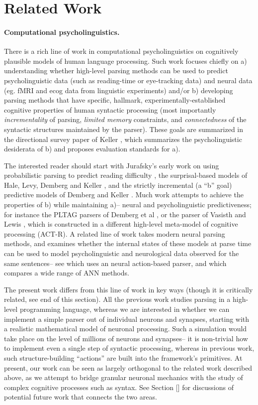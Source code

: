 \section{Related Work}
\paragraph{Computational psycholinguistics.} There is a rich line of work in computational psycholinguistics on cognitively plausible models of human language processing. Such work focuses chiefly on a) understanding whether high-level parsing methods can be used to predict psycholinguistic data (such as reading-time or eye-tracking data) and neural data (eg. fMRI and ecog data from linguistic experiments) and/or b) developing parsing methods that have specific, hallmark, experimentally-established cognitive properties of human syntactic processing (most importantly {\em incrementality} of parsing, {\em limited memory} constraints, and {\em connectedness} of the syntactic structures maintained by the parser). These goals are summarized in the directional survey paper of Keller \cite{keller}, which summarizes the psycholinguistic desiderata of b) and proposes evaluation standards for a). 

The interested reader should start with Jurafsky’s early work on using probabilistic parsing to predict reading difficulty \cite{jurafsky}, the surprisal-based models of Hale, Levy, Demberg and Keller \cite{Hale2001, Levy2008, DembergKeller2008a}, and the strictly incremental (a “b” goal) predictive models of Demberg and Keller \cite{DembergKellery2008b, DembergKellery2009}.  Much work attempts to achieve the properties of b) while maintaining a)-- neural and psycholinguistic predictiveness;  for instance the PLTAG parsers of Demberg et al \cite{Demberg}, or the parser of Vasisth and Lewis \cite{Vasisth}, which is constructed in a different high-level meta-model of cognitive processing (ACT-R). A related line of work takes modern neural parsing methods, and examines whether the internal states of these models at parse time can be used to model psycholinguistic and neurological data observed for the same sentences-- see \cite{findingsyntax} which uses an neural action-based parser, and \cite{Schimpf} which compares a wide range of ANN methods.

The present work differs from this line of work in key ways (though it is critically related, see end of this section). All the previous work studies parsing in a high-level programming language, whereas we are interested in whether we can implement a simple parser out of individual neurons and synapses, starting with a realistic mathematical model of neuronal processing. Such a simulation would take place on the level of millions of neurons and synapses-- it is non-trivial how to implement even a single step of syntactic processing, whereas in previous work, such structure-building “actions” are built into the framework’s primitives. At present, our work can be seen as largely orthogonal to the related work described above, as we attempt to bridge granular neuronal mechanics with the study of complex cognitive processes such as syntax. See Section [] for discussions of potential future work that connects the two areas.


